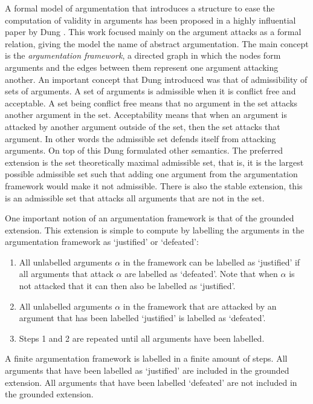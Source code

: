 \documentclass[a4paper]{article}
\begin{document}
A formal model of argumentation that introduces a structure to ease the
computation of validity in arguments has been proposed in a highly influential
paper by Dung \cite{dung1995}. This work focused mainly on the argument attacks
as a formal relation, giving the model the name of abstract argumentation. The
main concept is the \emph{argumentation framework}, a directed graph in which
the nodes form arguments and the edges between them represent one argument
attacking another. An important concept that Dung introduced was that of
admissibility of sets of arguments. A set of arguments is admissible when it is
conflict free and acceptable. A set being conflict free means that no argument
in the set attacks another argument in the set. Acceptability means that when
an argument is attacked by another argument outside of the set, then the set
attacks that argument. In other words the admissible set defends itself from
attacking arguments. On top of this Dung formulated other semantics. The
preferred extension is the set theoretically maximal admissible set, that is,
it is the largest possible admissible set such that adding one argument from
the argumentation framework would make it not admissible. There is also the
stable extension, this is an admissible set that attacks all arguments that are
not in the set.

One important notion of an argumentation framework is that of the grounded
extension. This extension is simple to compute by labelling the arguments in
the argumentation framework as `justified' or `defeated':
\begin{enumerate}
	\item All unlabelled arguments $\alpha$ in the framework can be labelled as
	`justified' if all arguments that attack $\alpha$ are labelled as
	`defeated'. Note that when $\alpha$ is not attacked that it can then also
	be labelled as `justified'.
	\item All unlabelled arguments $\alpha$ in the framework that are attacked
	by an argument that has been labelled `justified' is labelled as `defeated'.
	\item Steps 1 and 2 are repeated until all arguments have been labelled.
\end{enumerate}
A finite argumentation framework is labelled in a finite amount of steps. All
arguments that have been labelled as `justified' are included in the grounded
extension. All arguments that have been labelled `defeated' are not included in
the grounded extension.
\end{document}
